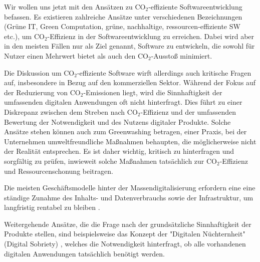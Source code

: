 \documentclass{article}
\begin{document}
Wir wollen uns jetzt mit den Ansätzen  zu CO$_2$-effiziente Softwareentwicklung befassen.
Es existieren zahlreiche Ansätze unter verschiedenen Bezeichnungen (Grüne IT, Green Computation, grüne, nachhaltige, ressourcen-effiziente SW etc.), um CO$_2$-Effizienz in der Softwareentwicklung zu erreichen. Dabei wird aber in den meisten Fällen nur als Ziel genannt, Software zu entwickeln, die sowohl für Nutzer einen Mehrwert bietet als auch den CO$_2$-Ausstoß minimiert.

Die Diskussion um CO$_2$-effiziente Software wirft allerdings auch kritische Fragen auf, insbesondere in Bezug auf den kommerziellen Sektor. Während der Fokus auf der Reduzierung von CO$_2$-Emissionen liegt, wird die Sinnhaftigkeit der umfassenden digitalen Anwendungen oft nicht hinterfragt. Dies führt zu einer Diskrepanz zwischen dem Streben nach CO$_2$-Effizienz und der umfassenden Bewertung der Notwendigkeit und des Nutzens digitaler Produkte. Solche Ansätze stehen können auch zum  Greenwashing betragen, einer Praxis, bei der Unternehmen umweltfreundliche Maßnahmen behaupten, die möglicherweise nicht der Realität entsprechen. 
Es ist daher wichtig, kritisch zu hinterfragen und sorgfältig zu prüfen, inwieweit solche Maßnahmen tatsächlich zur CO$_2$-Effizienz und Ressourcenschonung beitragen.

Die meisten Geschäftsmodelle hinter der Massendigitalisierung erfordern eine
eine ständige Zunahme des Inhalts- und Datenverbrauchs sowie der
Infrastruktur, um langfristig rentabel zu bleiben \cite{brouillard_deploying_2021}. 

 Weitergehende  Ansätze, die die Frage nach der grundsätzliche Sinnhaftigkeit der Produkte stellen, sind beispielsweise das Konzept der "Digitalen Nüchternheit" (Digital Sobriety) \cite{project_shift_2019,brouillard_deploying_2021}, welches die Notwendigkeit hinterfragt, ob alle vorhandenen digitalen Anwendungen tatsächlich benötigt werden. 
\end{document}
